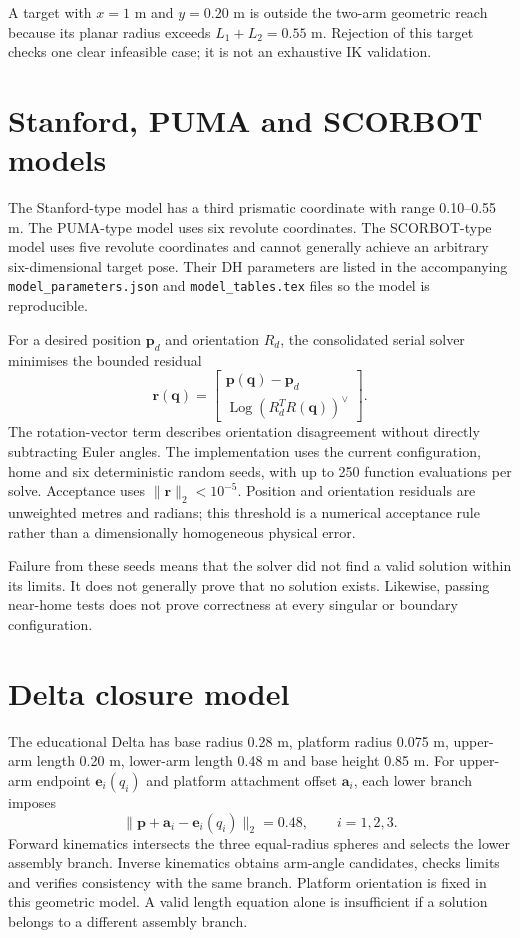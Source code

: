 \documentclass[11pt,a4paper,oneside]{report}
\begin{document}
A target with $x=1$ m and $y=0.20$ m is outside the two-arm geometric reach because its planar radius exceeds $L_1+L_2=0.55$ m. Rejection of this target checks one clear infeasible case; it is not an exhaustive IK validation.

\section{Stanford, PUMA and SCORBOT models}
The Stanford-type model has a third prismatic coordinate with range 0.10--0.55 m. The PUMA-type model uses six revolute coordinates. The SCORBOT-type model uses five revolute coordinates and cannot generally achieve an arbitrary six-dimensional target pose. Their DH parameters are listed in the accompanying \texttt{model\_parameters.json} and \texttt{model\_tables.tex} files so the model is reproducible.

For a desired position $\mathbf p_d$ and orientation $R_d$, the consolidated serial solver minimises the bounded residual
\begin{equation}
\mathbf r(\mathbf q)=\begin{bmatrix}\mathbf p(\mathbf q)-\mathbf p_d\\\operatorname{Log}(R_d^TR(\mathbf q))^\vee\end{bmatrix}.
\end{equation}
The rotation-vector term describes orientation disagreement without directly subtracting Euler angles. The implementation uses the current configuration, home and six deterministic random seeds, with up to 250 function evaluations per solve. Acceptance uses $\|\mathbf r\|_2<10^{-5}$. Position and orientation residuals are unweighted metres and radians; this threshold is a numerical acceptance rule rather than a dimensionally homogeneous physical error.

Failure from these seeds means that the solver did not find a valid solution within its limits. It does not generally prove that no solution exists. Likewise, passing near-home tests does not prove correctness at every singular or boundary configuration.

\section{Delta closure model}
The educational Delta has base radius 0.28 m, platform radius 0.075 m, upper-arm length 0.20 m, lower-arm length 0.48 m and base height 0.85 m. For upper-arm endpoint $\mathbf e_i(q_i)$ and platform attachment offset $\mathbf a_i$, each lower branch imposes
\begin{equation}
\|\mathbf p+\mathbf a_i-\mathbf e_i(q_i)\|_2=0.48,\qquad i=1,2,3.
\end{equation}
Forward kinematics intersects the three equal-radius spheres and selects the lower assembly branch. Inverse kinematics obtains arm-angle candidates, checks limits and verifies consistency with the same branch. Platform orientation is fixed in this geometric model. A valid length equation alone is insufficient if a solution belongs to a different assembly branch.
\end{document}
